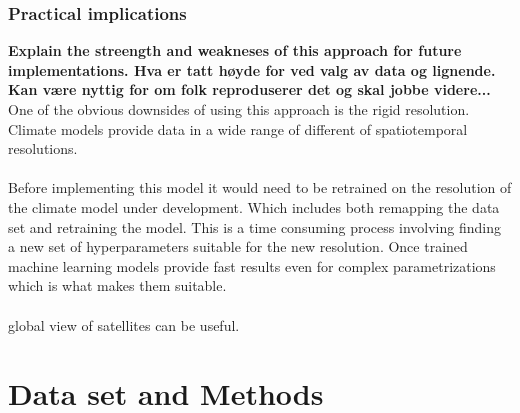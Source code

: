 \subsubsection{Practical implications} \label{sec:practical_implications}
\textbf{Explain the streength and weakneses of this approach for future implementations. Hva er tatt høyde for ved valg av data og lignende. Kan være nyttig for om folk reproduserer det og skal jobbe videre...}
One of the obvious downsides of using this approach is the rigid resolution. 
Climate models provide data in a wide range of different of spatiotemporal resolutions. 
\\ \\ 
Before implementing this model it would need to be retrained on the resolution of the climate model under development. Which includes both remapping the data set and retraining the model. This is a time consuming process involving finding a new set of hyperparameters suitable for the new resolution. Once trained machine learning models provide fast results even for complex parametrizations which is what makes them suitable. \\ \\ global view of satellites can be useful. 

\section{Data set and Methods}
